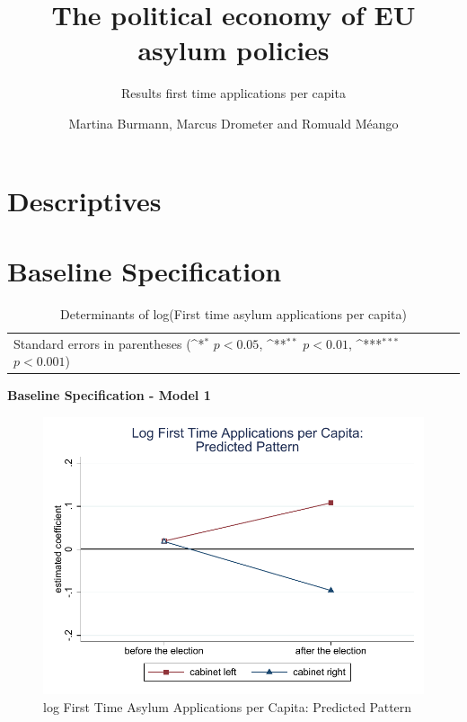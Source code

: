 \documentclass[10pt,a4paper]{scrartcl}
\begin{document}
	\title{The political economy of EU asylum policies}
	\subtitle{Results first time applications per capita}
	\author{Martina Burmann, Marcus Drometer and Romuald Méango}
	\maketitle

\clearpage

\tableofcontents

\clearpage
\FloatBarrier
\section{Descriptives}

 
 
 
 
 
 
\clearpage
\FloatBarrier
\section{Baseline Specification}
\begin{table}[!ht]\centering
\renewcommand{\arraystretch}{1.25}
\small
\def\sym#1{\ifmmode^{#1}\else\(^{#1}\)\fi}
\caption{Determinants of log(First time asylum applications per capita)}
\begin{tabular}{l*{3}{c}}
	\hline\hline
	
	\hline\hline
	\multicolumn{4}{l}{\footnotesize Standard errors in parentheses (\sym{*} \(p<0.05\), \sym{**} \(p<0.01\), \sym{***} \(p<0.001\))}\\
\end{tabular}
\end{table}

\clearpage
\textbf{Baseline Specification - Model 1}
\begin{figure}[!ht]
	\centering
	\includegraphics[width=1\textwidth]{figures_edited/app_graph1_baseline.pdf}
	\caption{log First Time Asylum Applications per Capita: Predicted Pattern}
\end{figure}
\end{document}
